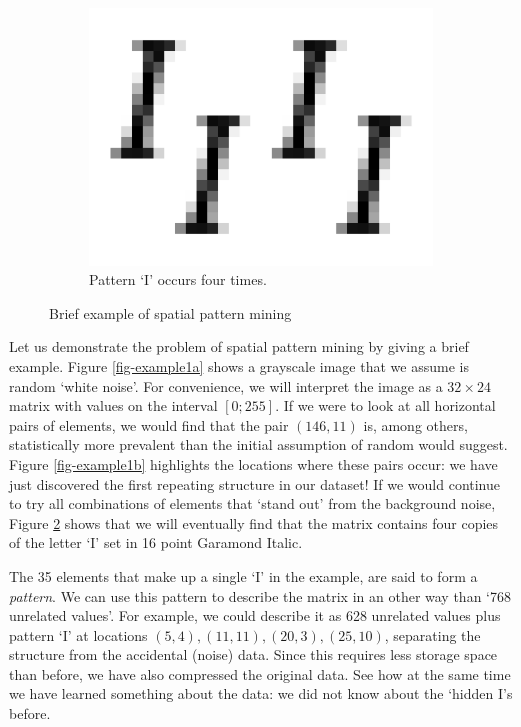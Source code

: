\documentclass{llncs}
\begin{document}
\begin{figure}
\begin{subfigure}[t]{0.33\textwidth}
\end{subfigure}%
~
\begin{subfigure}[t]{0.33\textwidth}
\centering
\includegraphics[scale=.25]{img/Garamond-I-clean.png}
\caption{Pattern `I' occurs four times.}
\label{fig-example1c}
\end{subfigure}%
\caption{Brief example of spatial pattern mining}
\end{figure}  

Let us demonstrate the problem of spatial pattern mining by giving a brief example. Figure \ref{fig-example1a} shows a grayscale image that we assume is random `white noise'. For convenience, we will interpret the image as a $32 \times 24$ matrix with values on the interval $[0;255]$. If we were to look at all horizontal pairs of elements, we would find that the pair $(146,11)$ is, among others, statistically more prevalent than the initial assumption of random would suggest. Figure \ref{fig-example1b} highlights the locations where these pairs occur: we have just discovered the first repeating structure in our dataset! If we would continue to try all combinations of elements that `stand out' from the background noise, Figure \ref{fig-example1c} shows that we will eventually find that the matrix contains four copies of the letter `I' set in 16 point Garamond Italic.

The 35 elements that make up a single `I' in the example, are said to form a \emph{pattern}. We can use this pattern to describe the matrix in an other way than `768 unrelated values'. For example, we could describe it as 628 unrelated values plus pattern `I' at locations $(5,4), (11,11), (20,3), (25,10)$, separating the structure from the accidental (noise) data. Since this requires less storage space than before, we have also compressed the original data. See how at the same time we have learned something about the data: we did not know about the `hidden I's before. 
\end{document}
